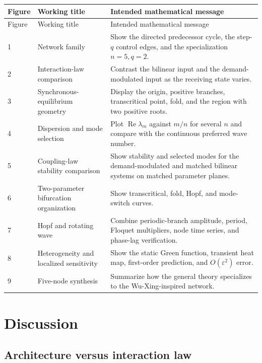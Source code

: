 \documentclass[11pt, reqno]{amsart}
\theoremstyle{definition}
\theoremstyle{remark}
\newcommand{\eps}{\varepsilon}
\newcommand{\Ree}{\operatorname{Re}}
\begin{document}
\begin{longtable}{p{1.1cm}p{4.5cm}p{8.5cm}}
\toprule
Figure & Working title & Intended mathematical message \\
\midrule
\endfirsthead
\toprule
Figure & Working title & Intended mathematical message \\
\midrule
\endhead
1 & Network family & Show the directed predecessor cycle, the step-$q$ control edges, and the specialization $n=5,q=2$. \\
2 & Interaction-law comparison & Contrast the bilinear input and the demand-modulated input as the receiving state varies. \\
3 & Synchronous-equilibrium geometry & Display the origin, positive branches, transcritical point, fold, and the region with two positive roots. \\
4 & Dispersion and mode selection & Plot $\Ree\lambda_m$ against $m/n$ for several $n$ and compare with the continuous preferred wave number. \\
5 & Coupling-law stability comparison & Show stability and selected modes for the demand-modulated and matched bilinear systems on matched parameter planes. \\
6 & Two-parameter bifurcation organization & Show transcritical, fold, Hopf, and mode-switch curves. \\
7 & Hopf and rotating wave & Combine periodic-branch amplitude, period, Floquet multipliers, node time series, and phase-lag verification. \\
8 & Heterogeneity and localized sensitivity & Show the static Green function, transient heat map, first-order prediction, and $O(\eps^2)$ error. \\
9 & Five-node synthesis & Summarize how the general theory specializes to the Wu-Xing-inspired network. \\
\bottomrule
\end{longtable}

\section{Discussion}
\label{sec:discussion}

\subsection{Architecture versus interaction law}
\end{document}
